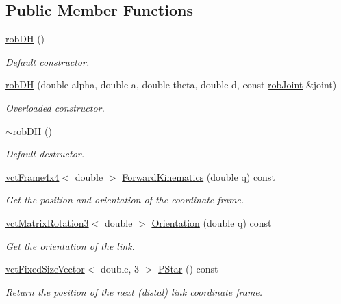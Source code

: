 \subsection*{Public Member Functions}
\begin{DoxyCompactItemize}
\item 
\hyperlink{classrob_d_h_af53c2219f28c3c3d76dfcec27693d8d7}{rob\+D\+H} ()
\begin{DoxyCompactList}\small\item\em Default constructor. \end{DoxyCompactList}\item 
\hyperlink{classrob_d_h_ae7919ad5cd95f4bf5aefeb7d7515a95f}{rob\+D\+H} (double alpha, double a, double theta, double d, const \hyperlink{classrob_joint}{rob\+Joint} \&joint)
\begin{DoxyCompactList}\small\item\em Overloaded constructor. \end{DoxyCompactList}\item 
\hyperlink{classrob_d_h_a8d612b9672a85a282d49dd07e151fdcf}{$\sim$rob\+D\+H} ()
\begin{DoxyCompactList}\small\item\em Default destructor. \end{DoxyCompactList}\item 
\hyperlink{classvct_frame4x4}{vct\+Frame4x4}$<$ double $>$ \hyperlink{classrob_d_h_a9af5ef66e5269ce07b75a892428cabdd}{Forward\+Kinematics} (double q) const 
\begin{DoxyCompactList}\small\item\em Get the position and orientation of the coordinate frame. \end{DoxyCompactList}\item 
\hyperlink{classvct_matrix_rotation3}{vct\+Matrix\+Rotation3}$<$ double $>$ \hyperlink{classrob_d_h_adcd73e6facecdcf4ba1972aaa93994a6}{Orientation} (double q) const 
\begin{DoxyCompactList}\small\item\em Get the orientation of the link. \end{DoxyCompactList}\item 
\hyperlink{classvct_fixed_size_vector}{vct\+Fixed\+Size\+Vector}$<$ double, 3 $>$ \hyperlink{classrob_d_h_ace414bb1d30d48e9d1d239e597921b65}{P\+Star} () const 
\begin{DoxyCompactList}\small\item\em Return the position of the next (distal) link coordinate frame. \end{DoxyCompactList}\item 

\end{DoxyCompactItemize}
